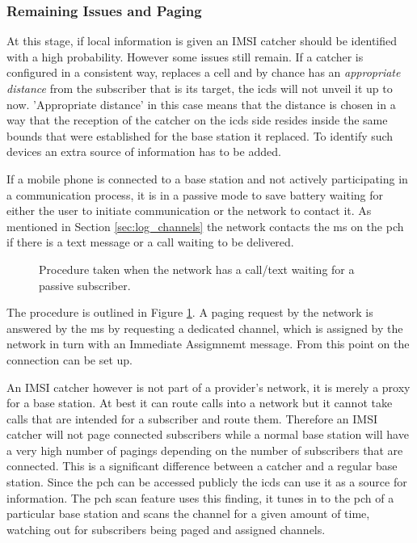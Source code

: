 \subsubsection{Remaining Issues and Paging}
At this stage, if local information is given an IMSI catcher should be identified with a high probability.
However some issues still remain.
If a catcher is configured in a consistent way, replaces a cell and by chance has an \emph{appropriate distance} from the subscriber that is its target, the \gls{icds} will not unveil it up to now.
'Appropriate distance' in this case means that the distance is chosen in a way that the reception of the catcher on the \gls{icds} side resides inside the same bounds that were established for the base station it replaced.
To identify such devices an extra source of information has to be added.

If a mobile phone is connected to a base station and not actively participating in a communication process, it is in a passive mode to save battery waiting for either the user to initiate communication or the network to contact it.
As mentioned in Section \ref{sec:log_channels} the network contacts the \gls{ms} on the \gls{pch} if there is a text message or a call waiting to be delivered.
\begin{figure}
\centering
\caption{Procedure taken when the network has a call/text waiting for a passive subscriber.}
\label{fig:paging}
\end{figure}
The procedure is outlined in Figure \ref{fig:paging}.
A paging request by the network is answered by the \gls{ms} by requesting a dedicated channel, which is assigned by the network in turn with an Immediate Assigmnemt message.
From this point on the connection can be set up.

An IMSI catcher however is not part of a provider's network, it is merely a proxy for a base station.
At best it can route calls into a network but it cannot take calls that are intended for a subscriber and route them.
Therefore an IMSI catcher will not page connected subscribers while a normal base station will have a very high number of pagings depending on the number of subscribers that are connected.
This is a significant difference between a catcher and a regular base station.
Since the \gls{pch} can be accessed publicly the \gls{icds} can use it as a source for information.
The \gls{pch} scan feature uses this finding, it tunes in to the \gls{pch} of a particular base station and scans the channel for a given amount of time, watching out for subscribers being paged and assigned channels.

